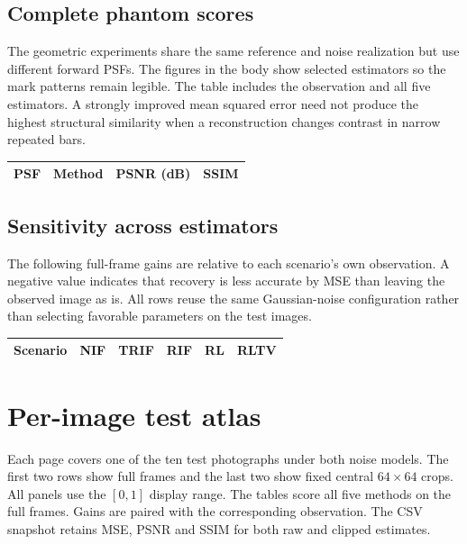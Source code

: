 \subsection{Complete phantom scores}

The geometric experiments share the same reference and noise realization but use different forward PSFs. The figures in the body show selected estimators so the mark patterns remain legible. The table includes the observation and all five estimators. A strongly improved mean squared error need not produce the highest structural similarity when a reconstruction changes contrast in narrow repeated bars.

\begin{center}
\small
{}
\begin{tabular}{llrr}
\toprule PSF & Method & PSNR (dB) & SSIM\\\midrule

\end{tabular}
\end{center}

\subsection{Sensitivity across estimators}

The following full-frame gains are relative to each scenario's own observation. A negative value indicates that recovery is less accurate by MSE than leaving the observed image as is. All rows reuse the same Gaussian-noise configuration rather than selecting favorable parameters on the test images.

\begin{center}
\small\setlength{\tabcolsep}{4pt}
\begin{tabular}{lrrrrr}
\toprule Scenario & NIF & TRIF & RIF & RL & RLTV\\\midrule

\end{tabular}
\end{center}

\clearpage
\section{Per-image test atlas}
\label{app:atlas}

Each page covers one of the ten test photographs under both noise models. The first two rows show full frames and the last two show fixed central \(64\times64\) crops. All panels use the \([0,1]\) display range. The tables score all five methods on the full frames. Gains are paired with the corresponding observation. The CSV snapshot retains MSE, PSNR and SSIM for both raw and clipped estimates.


